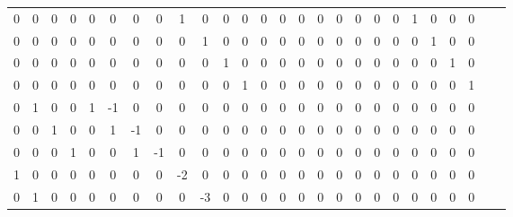 \begin{tabular}{cccccccccccccccccccccccccc}
       0  &       0  &       0  &       0  &       0  &       0  &       0  &       0  &       1  &       0  &       0  &       0  &       0  &       0  &       0  &       0  &       0  &       0  &       0  &       0  &       1  &       0  &       0  &       0 \\
       0  &       0  &       0  &       0  &       0  &       0  &       0  &       0  &       0  &       1  &       0  &       0  &       0  &       0  &       0  &       0  &       0  &       0  &       0  &       0  &       0  &       1  &       0  &       0 \\
       0  &       0  &       0  &       0  &       0  &       0  &       0  &       0  &       0  &       0  &       1  &       0  &       0  &       0  &       0  &       0  &       0  &       0  &       0  &       0  &       0  &       0  &       1  &       0 \\
       0  &       0  &       0  &       0  &       0  &       0  &       0  &       0  &       0  &       0  &       0  &       1  &       0  &       0  &       0  &       0  &       0  &       0  &       0  &       0  &       0  &       0  &       0  &       1 \\
       0  &       1  &       0  &       0  &       1  &     -1  &       0  &       0  &       0  &       0  &       0  &       0  &       0  &       0  &       0  &       0  &       0  &       0  &       0  &       0  &       0  &       0  &       0  &       0 \\
       0  &       0  &       1  &       0  &       0  &       1  &     -1  &       0  &       0  &       0  &       0  &       0  &       0  &       0  &       0  &       0  &       0  &       0  &       0  &       0  &       0  &       0  &       0  &       0 \\
       0  &       0  &       0  &       1  &       0  &       0  &       1  &     -1  &       0  &       0  &       0  &       0  &       0  &       0  &       0  &       0  &       0  &       0  &       0  &       0  &       0  &       0  &       0  &       0 \\
       1  &       0  &       0  &       0  &       0  &       0  &       0  &       0  &     -2  &       0  &       0  &       0  &       0  &       0  &       0  &       0  &       0  &       0  &       0  &       0  &       0  &       0  &       0  &       0 \\
       0  &       1  &       0  &       0  &       0  &       0  &       0  &       0  &       0  &     -3  &       0  &       0  &       0  &       0  &       0  &       0  &       0  &       0  &       0  &       0  &       0  &       0  &       0  &       0 \\

\end{tabular}
